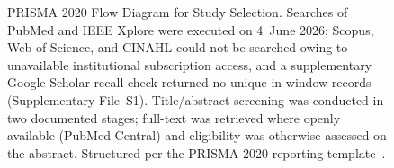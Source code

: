 \begin{figure}[H]

\caption[PRISMA 2020 Flow Diagram for Study Selection]{PRISMA 2020 Flow Diagram for Study Selection. Searches of PubMed and IEEE Xplore were executed on 4~June 2026; Scopus, Web of Science, and CINAHL could not be searched owing to unavailable institutional subscription access, and a supplementary Google Scholar recall check returned no unique in-window records (Supplementary File~S1). Title/abstract screening was conducted in two documented stages; full-text was retrieved where openly available (PubMed Central) and eligibility was otherwise assessed on the abstract. Structured per the PRISMA 2020 reporting template~\cite{prisma2020flow}.}
\label{fig:prisma-flow}

\end{figure}
